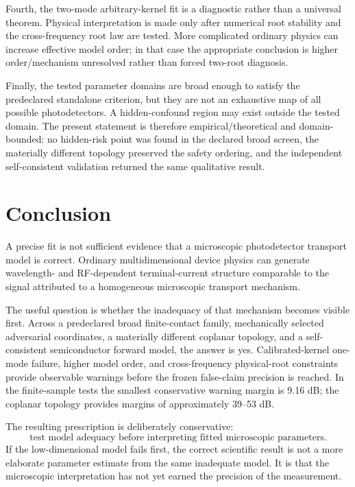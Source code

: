 \documentclass[11pt]{article}
\begin{document}
Fourth, the two-mode arbitrary-kernel fit is a diagnostic rather than a universal theorem. Physical interpretation is made only after numerical root stability and the cross-frequency root law are tested. More complicated ordinary physics can increase effective model order; in that case the appropriate conclusion is higher order/mechanism unresolved rather than forced two-root diagnosis.

Finally, the tested parameter domains are broad enough to satisfy the predeclared standalone criterion, but they are not an exhaustive map of all possible photodetectors. A hidden-confound region may exist outside the tested domain. The present statement is therefore empirical/theoretical and domain-bounded: no hidden-risk point was found in the declared broad screen, the materially different topology preserved the safety ordering, and the independent self-consistent validation returned the same qualitative result.

\section{Conclusion}

A precise fit is not sufficient evidence that a microscopic photodetector transport model is correct. Ordinary multidimensional device physics can generate wavelength- and RF-dependent terminal-current structure comparable to the signal attributed to a homogeneous microscopic transport mechanism.

The useful question is whether the inadequacy of that mechanism becomes visible first. Across a predeclared broad finite-contact family, mechanically selected adversarial coordinates, a materially different coplanar topology, and a self-consistent semiconductor forward model, the answer is yes. Calibrated-kernel one-mode failure, higher model order, and cross-frequency physical-root constraints provide observable warnings before the frozen false-claim precision is reached. In the finite-sample tests the smallest conservative warning margin is 9.16 dB; the coplanar topology provides margins of approximately 39--53 dB.

The resulting prescription is deliberately conservative:
\begin{equation*}
\boxed{\text{test model adequacy before interpreting fitted microscopic parameters.}}
\end{equation*}
If the low-dimensional model fails first, the correct scientific result is not a more elaborate parameter estimate from the same inadequate model. It is that the microscopic interpretation has not yet earned the precision of the measurement.
\end{document}
